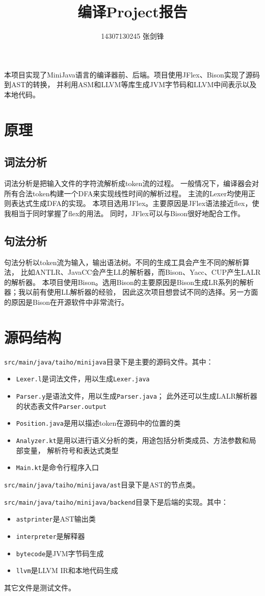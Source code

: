 \documentclass[a4paper]{article}
\title{编译Project报告}
\author{14307130245 张剑锋}
\begin{document}
\maketitle

本项目实现了MiniJava语言的编译器前、后端。项目使用JFlex、Bison实现了源码到AST的转换，
并利用ASM和LLVM等库生成JVM字节码和LLVM中间表示以及本地代码。

\section{原理}
\subsection{词法分析}
词法分析是把输入文件的字符流解析成token流的过程。
一般情况下，编译器会对所有合法token构建一个DFA来实现线性时间的解析过程。
主流的Lexer均使用正则表达式生成DFA的实现。
本项目选用JFlex。主要原因是JFlex语法接近flex，使我相当于同时掌握了flex的用法。
同时，JFlex可以与Bison很好地配合工作。

\subsection{句法分析}
句法分析以token流为输入，输出语法树。不同的生成工具会产生不同的解析算法，
比如ANTLR、JavaCC会产生LL的解析器，而Bison、Yacc、CUP产生LALR的解析器。
本项目使用Bison。选用Bison的主要原因是Bison生成LR系列的解析器；我以前有使用LL解析器的经验，
因此这次项目想尝试不同的选择。另一方面的原因是Bison在开源软件中非常流行。

\section{源码结构}
{\tt src/main/java/taiho/minijava}目录下是主要的源码文件。其中：
\begin{itemize}
    \item {\tt Lexer.l}是词法文件，用以生成{\tt Lexer.java}
    \item {\tt Parser.y}是语法文件，用以生成{\tt Parser.java}；
          此外还可以生成LALR解析器的状态表文件{\tt Parser.output}
    \item {\tt Position.java}是用以描述token在源码中的位置的类
    \item {\tt Analyzer.kt}是用以进行语义分析的类，用途包括分析类成员、方法参数和局部变量，
        解析符号和表达式类型
    \item {\tt Main.kt}是命令行程序入口
\end{itemize} \par
{\tt src/main/java/taiho/minijava/ast}目录下是AST的节点类。 \par
{\tt src/main/java/taiho/minijava/backend}目录下是后端的实现。其中：
\begin{itemize}
    \item {\tt astprinter}是AST输出类
    \item {\tt interpreter}是解释器
    \item {\tt bytecode}是JVM字节码生成
    \item {\tt llvm}是LLVM IR和本地代码生成
\end{itemize}
其它文件是测试文件。
\end{document}
